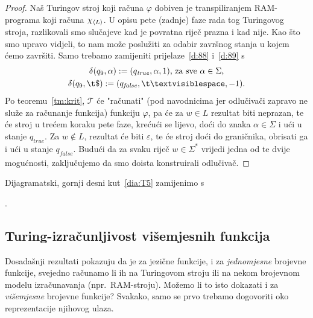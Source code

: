 \begin{proof}
Naš Turingov stroj koji računa $\varphi$ dobiven je transpiliranjem RAM-programa koji računa $\chi_{\langle L\rangle}$. U opisu pete (zadnje) faze rada tog Turingovog stroja, razlikovali smo slučajeve kad je povratna riječ prazna i kad nije. Kao što smo upravo vidjeli, to nam može poslužiti za odabir završnog stanja u kojem ćemo završiti. Samo trebamo zamijeniti prijelaze~\eqref{d:88} i~\eqref{d:89} s
\begin{gather}
\label{eq:d88j}
    \delta(q_9,\alpha):=(q_\mathit{true},\alpha,1)\text{, za sve }\alpha\in\Sigma\text,\\
\label{eq:d89j}
    \delta(q_9,\t\$):=(q_\mathit{false},\bl,-1)\text.
\end{gather}
Po teoremu~\ref{tm:krit}, $\mathcal T$ će "računati" (pod navodnicima jer odlučivači zapravo ne služe za računanje funkcija) funkciju $\varphi$, pa će za $w\in L$ rezultat biti neprazan, te će stroj u trećem koraku pete faze, krećući se lijevo, doći do znaka $\alpha\in\Sigma$ i ući u stanje $q_\mathit{true}$. Za $w\not\in L$, rezultat će biti $\varepsilon$, te će stroj doći do graničnika, obrisati ga i ući u stanje $q_\mathit{false}$. Budući da za svaku riječ $w\in\Sigma^*$ vrijedi jedna od te dvije mogućnosti, zaključujemo da smo doista konstruirali odlučivač.
\end{proof}
\vspace{-4mm}

Dijagramatski, gornji desni kut~\eqref{dia:T5} zamijenimo s\quad {}\;.
\vspace{-12mm}

\subsection{Turing-izračunljivost višemjesnih funkcija}

Dosadašnji rezultati pokazuju da je za jezične funkcije, i za \emph{jednomjesne} brojevne funkcije, svejedno računamo li ih na Turingovom stroju ili na nekom brojevnom modelu izračunavanja (npr.\ RAM-stroju). Možemo li to isto dokazati i za \emph{višemjesne} brojevne funkcije? Svakako, samo se prvo trebamo dogovoriti oko reprezentacije njihovog ulaza.

